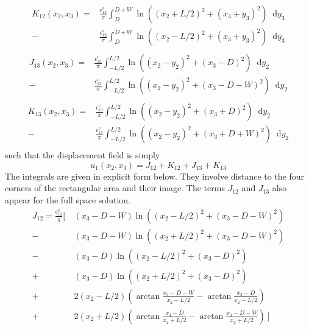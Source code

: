 \documentclass[letterpaper,12pt,]{memoir}
\newcommand*\diff{\mathop{}\!\mathrm{d}}
\begin{document}
\begin{equation}
\begin{aligned}
K_{12}(x_2,x_3)=&\frac{\epsilon_{12}^v}{\pi}\int_{D}^{D+W} \ln\left((x_2+L/2)^2+(x_3+y_3)^2\right)\diff y_3\\
-&\frac{\epsilon_{12}^v}{\pi}\int_{D}^{D+W} \ln\left((x_2-L/2)^2+(x_3+y_3)^2\right)\diff y_3\\
\end{aligned}
\end{equation}
\begin{equation}
\begin{aligned}
J_{13}(x_2,x_3)=&\frac{\epsilon_{13}^v}{\pi}\int_{-L/2}^{L/2} \ln\left((x_2-y_2)^2+(x_3-D)^2\right)\diff y_2\\
-&\frac{\epsilon_{13}^v}{\pi}\int_{-L/2}^{L/2} \ln\left((x_2-y_2)^2+(x_3-D-W)^2\right)\diff y_2\\
\end{aligned}
\end{equation}
\begin{equation}
\begin{aligned}
K_{13}(x_2,x_3)=&\frac{\epsilon_{13}^v}{\pi}\int_{-L/2}^{L/2} \ln\left((x_2-y_2)^2+(x_3+D)^2\right)\diff y_2\\
-&\frac{\epsilon_{13}^v}{\pi}\int_{-L/2}^{L/2} \ln\left((x_2-y_2)^2+(x_3+D+W)^2\right)\diff y_2\\
\end{aligned}
\end{equation}
such that the displacement field is simply
\begin{equation}
 u_1(x_2,x_3)=J_{12}+K_{12}+J_{13}+K_{13}
\end{equation}
The integrals are given in explicit form below. They involve distance to the four corners of the rectangular area and their image. The terms $J_{12}$ and $J_{13}$ also appear for the full space solution.
 \begin{equation}
 \begin{aligned}
J_{12}= \frac{\epsilon_{12}^v}{\pi} \bigg[~&
\left( x_3-D-W \right) \ln\left((x_2-L/2)^2+(x_3-D-W)^2\right)\\
-& \left( x_3-D-W\right) \ln\left((x_2+L/2)^2+(x_3-D-W)^2\right)\\
-& \left(x_3-D\right) \ln\left((x_2-L/2)^2+(x_3-D)^2\right)\\
+&\left(x_3-D\right) \ln\left((x_2+L/2)^2+(x_3-D)^2\right)\\
+& 2\left( x_2-L/2 \right)\left(\arctan\frac {x_3-D-W}{x_2-L/2}-\arctan\frac {x_3-D}{x_2-L/2}\right)\\
+& 2\left( x_2+L/2 \right)\left(\arctan\frac {x_3-D}{x_2+L/2}-\arctan\frac {x_3-D-W}{x_2+L/2}\right)~ \bigg]
 \end{aligned}
 \end{equation}
\end{document}

